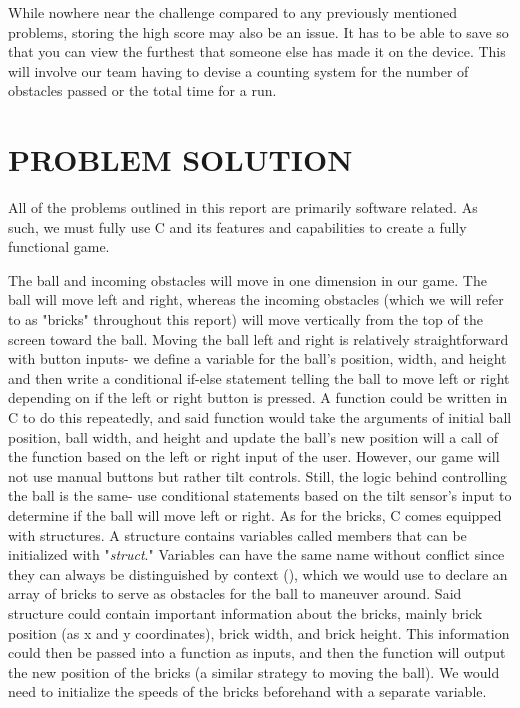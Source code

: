 \documentclass[12pt]{article}
\begin{document}
While nowhere near the challenge compared to any previously mentioned problems, storing the high score may also be an issue. It has to be able to save so that you can view the furthest that someone else has made it on the device. This will involve our team having to devise a counting system for the number of obstacles passed or the total time for a run. 


\newpage
\section{PROBLEM SOLUTION}
All of the problems outlined in this report are primarily software related. As such, we must fully use C and its features and capabilities to create a fully functional game. 

The ball and incoming obstacles will move in one dimension in our game. The ball will move left and right, whereas the incoming obstacles (which we will refer to as "bricks" throughout this report) will move vertically from the top of the screen toward the ball. Moving the ball left and right is relatively straightforward with button inputs- we define a variable for the ball's position, width, and height and then write a conditional if-else statement telling the ball to move left or right depending on if the left or right button is pressed. A function could be written in C to do this repeatedly, and said function would take the arguments of initial ball position, ball width, and height and update the ball's new position will a call of the function based on the left or right input of the user. However, our game will not use manual buttons but rather tilt controls. Still, the logic behind controlling the ball is the same- use conditional statements based on the tilt sensor's input to determine if the ball will move left or right. As for the bricks, C comes equipped with structures. A structure contains variables called members that can be initialized with "\emph{struct}." Variables can have the same name without conflict since they can always be distinguished by context (\parencite{kernighan1978c}), which we would use to declare an array of bricks to serve as obstacles for the ball to maneuver around. Said structure could contain important information about the bricks, mainly brick position (as x and y coordinates), brick width, and brick height. This information could then be passed into a function as inputs, and then the function will output the new position of the bricks (a similar strategy to moving the ball). We would need to initialize the speeds of the bricks beforehand with a separate variable.
\end{document}

